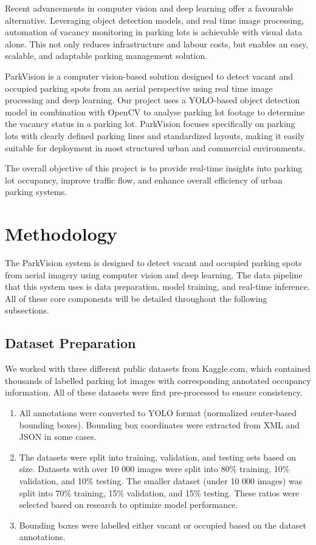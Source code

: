 \documentclass[12pt, letterpaper, oneside]{article}
\begin{document}
Recent advancements in computer vision and deep learning offer a favourable alternative. Leveraging object detection models, and real time image processing, automation of vacancy monitoring in parking lots is achievable with visual data alone. This not only reduces infrastructure and labour costs, but enables an easy, scalable, and adaptable parking management solution.

ParkVision is a computer vision-based solution designed to detect vacant and occupied parking spots from an aerial perspective using real time image processing and deep learning. Our project uses a YOLO-based object detection model in combination with OpenCV to analyse parking lot footage to determine the vacancy status in a parking lot. ParkVision focuses specifically on parking lots with clearly defined parking lines and standardized layouts, making it easily suitable for deployment in most structured urban and commercial environments.

The overall objective of this project is to provide real-time insights into parking lot occupancy, improve traffic flow, and enhance overall efficiency of urban parking systems.

\section{Methodology}
\label{sec:methodology}
The ParkVision system is designed to detect vacant and occupied parking spots from aerial imagery using computer vision and deep learning. The data pipeline that this system uses is data preparation, model training, and real-time inference. All of these core components will be detailed throughout the following subsections.


\subsection{Dataset Preparation}

We worked with three different public datasets from Kaggle.com, which contained thousands of labelled parking lot images with corresponding annotated occupancy information. All of these datasets were first pre-processed to ensure consistency.

\begin{enumerate}
    \item All annotations were converted to YOLO format (normalized center-based bounding boxes). Bounding box coordinates were extracted from XML and JSON in some cases.

    \item The datasets were split into training, validation, and testing sets based on size. Datasets with over 10 000 images were split into 80\% training, 10\% validation, and 10\% testing. The smaller dataset (under 10 000 images) was split into 70\% training, 15\% validation, and 15\% testing. These ratios were selected based on research to optimize model performance.

    \item Bounding boxes were labelled either vacant or occupied based on the dataset annotations.
    
\end{enumerate}
\end{document}
